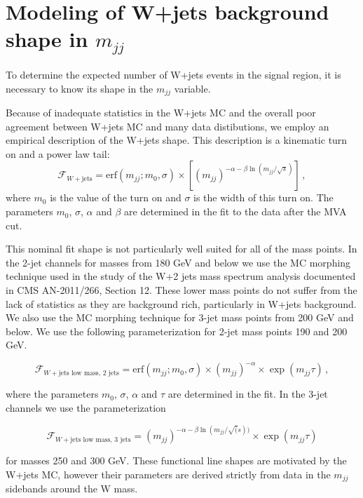 \section{Modeling of W+jets background shape in \texorpdfstring{$m_{jj}$}{dijet invariant mass} }
\label{sec:wjetsShape}

To determine the expected number of W+jets events in the signal region,
it is necessary to know its shape in the $m_{jj}$ variable.

Because of inadequate statistics in the W+jets MC and the overall poor
agreement between W+jets MC and many data distibutions, we employ an
empirical description of the W+jets shape.  This description is a
kinematic turn on and a power law tail:
\begin{equation}
  \mathcal{F}_{W+\text{jets}} = \text{erf}(m_{jj}; m_0, \sigma)\times\left[(m_{jj})^{-\alpha-\beta\ln(m_{jj}/\sqrt{s})}\right]\,,
\end{equation}
where $m_0$ is the value of the turn on and $\sigma$ is the width of
this turn on.  The parameters $m_0$, $\sigma$, $\alpha$ and $\beta$
are determined in the fit to the data after the MVA cut.

This nominal fit shape is not particularly well suited for all of the
mass points.  In the 2-jet channels for masses from 180 GeV and below
we use the MC morphing technique used in the study of the W+2 jets
mass spectrum analysis documented in CMS AN-2011/266, Section 12.
These lower mass points do not suffer from the lack of statistics as
they are background rich, particularly in W+jets background.  We also
use the MC morphing technique for 3-jet mass points from 200 GeV and
below.  We use the following parameterization for 2-jet mass points
190 and 200 GeV.

\begin{equation}
  \mathcal{F}_{W+\text{jets low mass, 2 jets}} = \text{erf}(m_{jj}; m_0, \sigma)\times(m_{jj})^{-\alpha}\times\exp(m_{jj}\tau)\,,
\end{equation}

where the parameters $m_0$, $\sigma$, $\alpha$ and $\tau$ are
determined in the fit.  In the 3-jet channels we use the
parameterization

\begin{equation}
  \mathcal{F}_{W+\text{jets low mass, 3 jets}} = (m_{jj})^{-\alpha-\beta\ln(m_{jj}/\sqrt(s))}\times\exp(m_{jj}\tau)
\end{equation}

for masses 250 and 300 GeV.  These functional line shapes are
motivated by the W+jets MC, however their parameters are derived
strictly from data in the $m_{jj}$ sidebands around the W mass.
